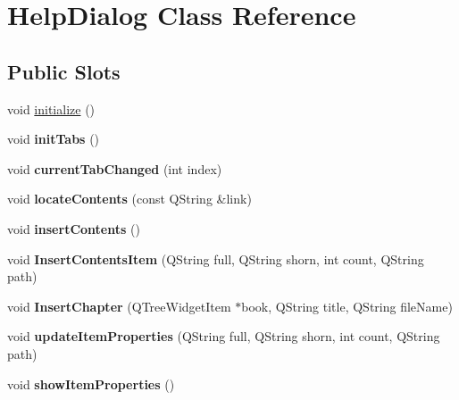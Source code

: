 \hypertarget{classHelpDialog}{
\section{HelpDialog Class Reference}
\label{classHelpDialog}
}
\subsection*{Public Slots}
\begin{DoxyCompactItemize}
\item 
void \hyperlink{classHelpDialog_a82bd946d03fdad2a11ce3c0f1136ca0f}{initialize} ()
\item 
\hypertarget{classHelpDialog_a41c9d77840b9416bf5982ac1db7a1cde}{
void {\bfseries initTabs} ()}
\label{classHelpDialog_a41c9d77840b9416bf5982ac1db7a1cde}

\item 
\hypertarget{classHelpDialog_abb1b74e834cc2f3c3caf31249cb1250d}{
void {\bfseries currentTabChanged} (int index)}
\label{classHelpDialog_abb1b74e834cc2f3c3caf31249cb1250d}

\item 
\hypertarget{classHelpDialog_a9aac5b75e91912a2446bb9f5d5fb4eb0}{
void {\bfseries locateContents} (const QString \&link)}
\label{classHelpDialog_a9aac5b75e91912a2446bb9f5d5fb4eb0}

\item 
\hypertarget{classHelpDialog_a40e4c1987d9656ad805f78d83a967400}{
void {\bfseries insertContents} ()}
\label{classHelpDialog_a40e4c1987d9656ad805f78d83a967400}

\item 
\hypertarget{classHelpDialog_ac9caaae249318347bd32c46249bb165c}{
void {\bfseries InsertContentsItem} (QString full, QString shorn, int count, QString path)}
\label{classHelpDialog_ac9caaae249318347bd32c46249bb165c}

\item 
\hypertarget{classHelpDialog_a1332d1b606a50f39d626dcd728284c56}{
void {\bfseries InsertChapter} (QTreeWidgetItem $\ast$book, QString title, QString fileName)}
\label{classHelpDialog_a1332d1b606a50f39d626dcd728284c56}

\item 
\hypertarget{classHelpDialog_ac900df216943a4f48647c0a0b88d4b45}{
void {\bfseries updateItemProperties} (QString full, QString shorn, int count, QString path)}
\label{classHelpDialog_ac900df216943a4f48647c0a0b88d4b45}

\item 
\hypertarget{classHelpDialog_a7b470110a79f175c9c0dfd510f462df7}{
void {\bfseries showItemProperties} ()}
\label{classHelpDialog_a7b470110a79f175c9c0dfd510f462df7}


\end{DoxyCompactItemize}
